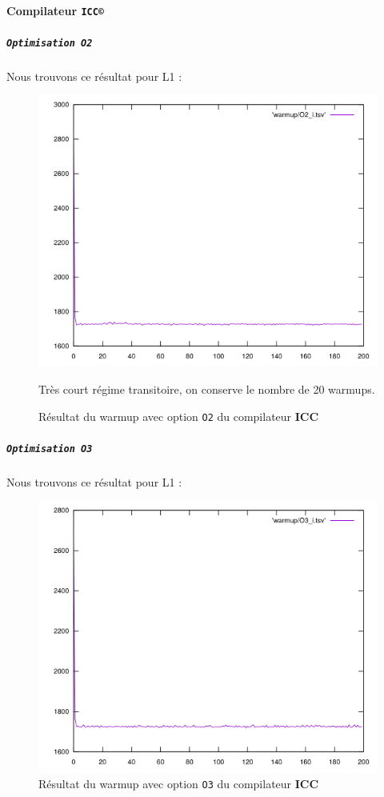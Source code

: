 \documentclass{report}
\begin{document}
\paragraph{Compilateur \texttt{ICC©}}
    \subparagraph{ \texttt{Optimisation O2}}
  Nous trouvons ce résultat pour L1 :
  \begin{figure}[ht!]
    \centering
\includegraphics[scale=0.45]{resources/L1/warmup/O2_i.png}
    \caption{Résultat du warmup avec option \texttt{O2} du compilateur \textbf{ICC}}
    
	Très court régime transitoire, on conserve le nombre de 20 warmups.    
  \end{figure}
  \newpage
\subparagraph{ \texttt{Optimisation O3}}
Nous trouvons ce résultat pour L1 :
\begin{figure}[ht!]
  \centering
  \includegraphics[scale=0.45]{resources/L1/warmup/O3_i.png}
  \caption{Résultat du warmup avec option \texttt{O3} du compilateur \textbf{ICC}}
\end{figure}
\end{document}
